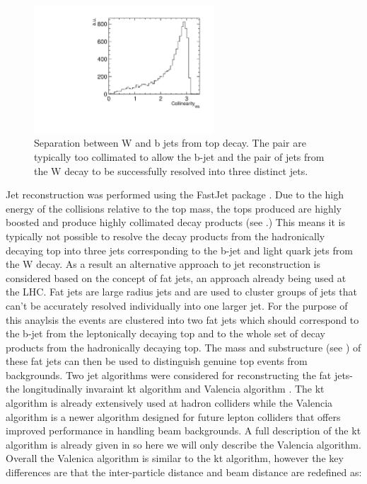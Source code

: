 \begin{figure}
  \centering
  \includegraphics[width=0.6\textwidth]{TopAnalysis/figures/WBCollinearity.pdf}
  \caption[Separation between W and b jet from top decay]{Separation between W and b jets from top decay. The pair are typically too collimated to allow the b-jet and the pair of jets from the W decay to be successfully resolved into three distinct jets.}
  \label{fig:Collimated}
\end{figure}

Jet reconstruction was performed using the FastJet package \cite{Cacciari:2011ma}. Due to the high energy of the collisions relative to the top mass, the tops produced are highly boosted and produce highly collimated decay products (see .) This means it is typically not possible to resolve the decay products from the hadronically decaying top into three jets corresponding to the b-jet and light quark jets from the W decay. As a result an alternative approach to jet reconstruction is considered based on the concept of fat jets, an approach already being used at the LHC\cite{Miller:2011qg}. Fat jets are large radius jets and are used to cluster groups of jets that can't be accurately resolved individually into one larger jet. For the purpose of this anaylsis the events are clustered into two fat jets which should correspond to the b-jet from the leptonically decaying top and to the whole set of decay products from the hadronically decaying top. The mass and substructure (see ) of these fat jets can then be used to distinguish genuine top events from backgrounds. Two jet algorithms were considered for reconstructing the fat jets- the longitudinally invaraint kt algorithm \cite{Cacciari:2008gp} and Valencia algorithm \cite{Boronat:2014hva}. The kt algorithm is already extensively used at hadron colliders while the Valencia algorithm is a newer algorithm designed for future lepton colliders that offers improved performance in handling beam backgrounds. A full description of the kt algorithm is already given in  so here we will only describe the Valencia algorithm. Overall the Valenica algorithm is similar to the kt algorithm, however the key differences are that the inter-particle distance and beam distance are redefined as:

